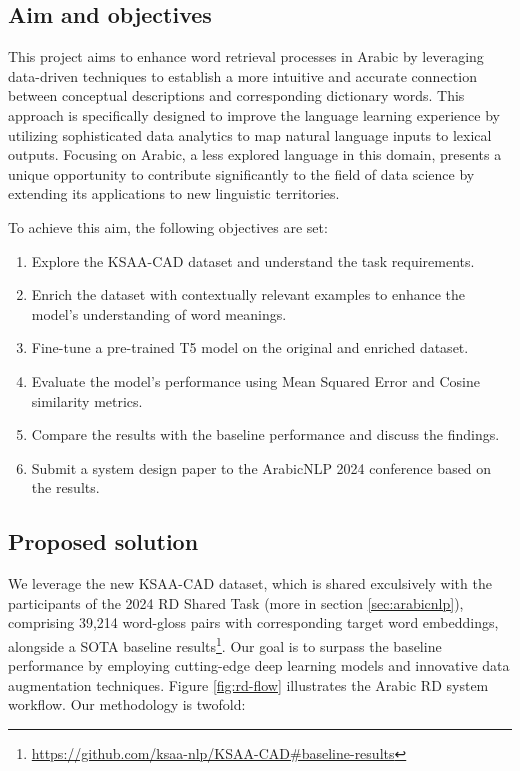 \documentclass[12pt]{article}
\begin{document}
\subsection{Aim and objectives}

This project aims to enhance word retrieval processes in Arabic by leveraging data-driven techniques to establish a more intuitive and accurate connection between conceptual descriptions and corresponding dictionary words. This approach is specifically designed to improve the language learning experience by utilizing sophisticated data analytics to map natural language inputs to lexical outputs. Focusing on Arabic, a less explored language in this domain, presents a unique opportunity to contribute significantly to the field of data science by extending its applications to new linguistic territories.

To achieve this aim, the following objectives are set:
\begin{enumerate}
    \item Explore the KSAA-CAD dataset and understand the task requirements.
    \item Enrich the dataset with contextually relevant examples to enhance the model's understanding of word meanings.
    \item Fine-tune a pre-trained T5 model on the original and enriched dataset.
    \item Evaluate the model's performance using Mean Squared Error and Cosine similarity metrics.
    \item Compare the results with the baseline performance and discuss the findings.
    \item Submit a system design paper to the ArabicNLP 2024 conference based on the results.
\end{enumerate}

\subsection{Proposed solution}

We leverage the new KSAA-CAD dataset, which is shared exculsively with the participants of the 2024 RD Shared Task (more in section \ref{sec:arabicnlp}), comprising 39,214 word-gloss pairs with corresponding target word embeddings, alongside a SOTA baseline results\footnote{\url{https://github.com/ksaa-nlp/KSAA-CAD\#baseline-results}}. Our goal is to surpass the baseline performance by employing cutting-edge deep learning models and innovative data augmentation techniques. Figure \ref{fig:rd-flow} illustrates the Arabic RD system workflow. Our methodology is twofold:
\end{document}
